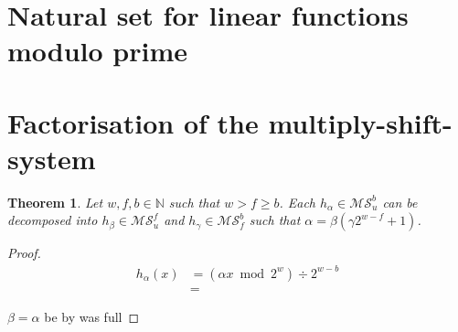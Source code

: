 \documentclass{article}
\newtheorem{theorem}{Theorem}
\begin{document}
\section{Natural set for linear functions modulo prime}

\section{Factorisation of the multiply-shift-system}

\begin{theorem}
Let $w, f, b \in \mathbb{N}$ such that $w > f \geq b$.
Each $h_\alpha \in \mathcal{MS}_{u}^{b}$ can be decomposed into $h_\beta \in \mathcal{MS}_{u}^{f}$ and $h_\gamma \in \mathcal{MS}_{f}^{b}$ such that $\alpha = \beta (\gamma 2 ^ {w - f} + 1)$.
\end{theorem}
\begin{proof}

\begin{align*}
h_\alpha(x) 
	& = (\alpha x \bmod 2^w) \div 2^{w - b} \\
	& = 
\end{align*}


$\beta = \alpha$ be by was full
\end{proof}



\end{document}
